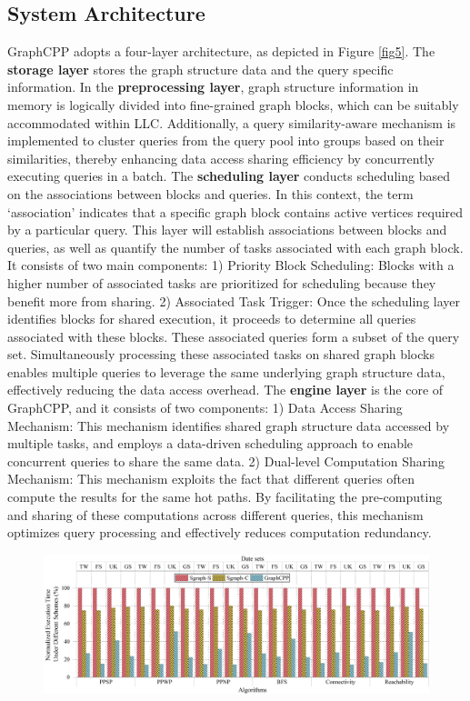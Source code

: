 \documentclass[10pt,journal,compsoc]{IEEEtran}
\begin{document}
\subsection{System Architecture}\label{3.1}
GraphCPP adopts a four-layer architecture, as depicted in Figure \ref{fig5}. 
The {\bf{storage layer}} stores the graph structure data and the query specific information. 
In the {\bf{preprocessing layer}}, graph structure information in memory is logically divided into fine-grained graph blocks, which can be suitably accommodated within LLC. Additionally, a query similarity-aware mechanism is implemented to cluster queries from the query pool into groups based on their similarities, thereby enhancing data access sharing efficiency by concurrently executing  queries in a batch.
The {\bf{scheduling layer}} conducts scheduling based on the associations between blocks and queries. In this context, the term `association' indicates that a specific graph block contains active vertices required by a particular query. This layer will establish associations between blocks and queries, as well as quantify the number of tasks associated with each graph block. It consists of two main components:
1) Priority Block Scheduling: Blocks with a higher number of associated tasks are prioritized for scheduling because they benefit more from sharing.
2) Associated Task Trigger: Once the scheduling layer identifies blocks for shared execution, it proceeds to determine all queries associated with these blocks.
These associated queries form a subset of the  query set.
Simultaneously processing these associated tasks on shared graph blocks enables multiple queries to leverage the same underlying graph structure data, effectively reducing the data access overhead.
The {\bf{engine layer}} is the core of GraphCPP, and it consists of two components:
1) Data Access Sharing Mechanism: This mechanism identifies shared graph structure data accessed by multiple tasks, and employs a data-driven scheduling approach to enable concurrent queries to share the same data.
2) Dual-level Computation Sharing Mechanism: This mechanism exploits the fact that different queries often compute the results for the same hot paths. By facilitating the pre-computing and sharing of these computations across different queries, this mechanism optimizes query processing and effectively reduces computation redundancy.

\begin{figure}[t]
	\centering
	\includegraphics[width=\columnwidth]{picture/Zhang-fig6.png} %
    \captionsetup{labelsep=period}
		\caption{} %
		\label{fig6} %
\end{figure}%
\end{document}
